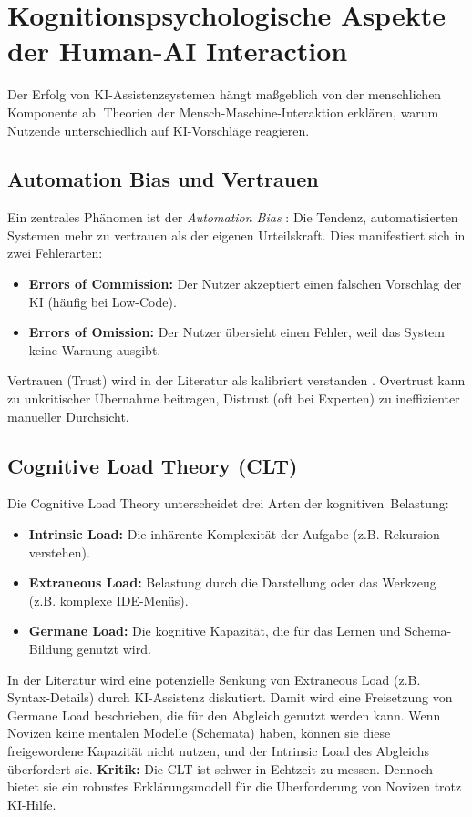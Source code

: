\section{Kognitionspsychologische Aspekte der Human-AI Interaction}
\label{sec:human-ai}

Der Erfolg von KI-Assistenzsystemen hängt maßgeblich von der menschlichen Komponente ab. Theorien der Mensch-Maschine-Interaktion erklären, warum Nutzende unterschiedlich auf KI-Vorschläge reagieren.

\subsection{Automation Bias und Vertrauen}
Ein zentrales Phänomen ist der \emph{Automation Bias} \parencite{parasuraman2010complacency}: Die Tendenz, automatisierten Systemen mehr zu vertrauen als der eigenen Urteilskraft. Dies manifestiert sich in zwei Fehlerarten:
\begin{itemize}
    \item  \textbf{Errors of Commission:} Der Nutzer akzeptiert einen falschen Vorschlag der KI (häufig bei Low-Code).
    \item  \textbf{Errors of Omission:} Der Nutzer übersieht einen Fehler, weil das System keine Warnung ausgibt.
\end{itemize}
Vertrauen (Trust) wird in der Literatur als kalibriert verstanden \parencite{leesee2004trust}. Overtrust kann zu unkritischer Übernahme beitragen, Distrust (oft bei Experten) zu ineffizienter manueller Durchsicht.

\subsection{Cognitive Load Theory (CLT)}
Die Cognitive Load Theory \parencite{sweller1988clt} unterscheidet drei Arten der kognitiven~Belastung:
\begin{itemize}
    \item  \textbf{Intrinsic Load:} Die inhärente Komplexität der Aufgabe (z.B. Rekursion verstehen).
    \item  \textbf{Extraneous Load:} Belastung durch die Darstellung oder das Werkzeug (z.B. komplexe IDE-Menüs).
    \item  \textbf{Germane Load:} Die kognitive Kapazität, die für das Lernen und Schema-Bildung genutzt wird.
\end{itemize}

In der Literatur wird eine potenzielle Senkung von Extraneous Load (z.B. Syntax-Details) durch KI-Assistenz diskutiert. Damit wird eine Freisetzung von Germane Load beschrieben, die für den Abgleich genutzt werden kann. Wenn Novizen keine mentalen Modelle (Schemata) haben, können sie diese freigewordene Kapazität nicht nutzen, und der Intrinsic Load des Abgleichs überfordert sie.
 \textbf{Kritik:} Die CLT ist schwer in Echtzeit zu messen. Dennoch bietet sie ein robustes Erklärungsmodell für die Überforderung von Novizen trotz KI-Hilfe.

